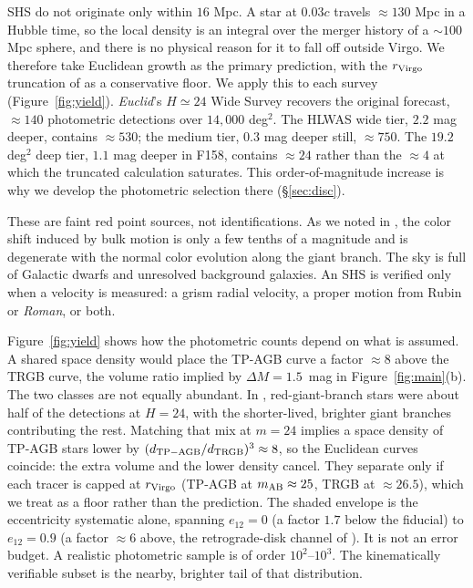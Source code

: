 \documentclass[twocolumn]{aastex701}
\begin{document}
SHS do not originate only within $16$ Mpc.
A star at $0.03c$ travels $\approx130$ Mpc in a Hubble time, so the local
density is an integral over the merger history of a $\sim100$ Mpc sphere, and
there is no physical reason for it to fall off outside Virgo. We therefore take
Euclidean growth as the primary prediction, with the $r_{\rm Virgo}$
truncation of  as a conservative floor. We apply this to each
survey (Figure~\ref{fig:yield}). \textit{Euclid}'s $H\simeq24$ Wide Survey
recovers the original  forecast, $\approx140$ photometric
detections over $14{,}000$ deg$^{2}$. The HLWAS wide tier, $2.2$ mag deeper,
contains $\approx530$; the medium tier, $0.3$ mag deeper still,
$\approx750$. The $19.2$ deg$^{2}$ deep tier, $1.1$ mag deeper in F158,
contains $\approx24$ rather than the $\approx4$ at which the truncated
calculation saturates. This order-of-magnitude increase is why we develop the
photometric selection there (\S\ref{sec:disc}).

These are faint red point sources, not identifications. As we noted in
, the color shift induced by bulk motion is only a few tenths
of a magnitude and is degenerate with the normal color evolution along the giant branch. The
sky is full of Galactic dwarfs and unresolved background galaxies. An SHS is
verified only when a velocity is measured: a grism radial velocity, a proper
motion from Rubin or \textit{Roman}, or both.

Figure~\ref{fig:yield} shows how the photometric counts depend on what is
assumed. A shared space density would place the TP-AGB curve a factor
$\approx8$ above the TRGB curve, the volume ratio implied by
$\Delta M=1.5$~mag in Figure~\ref{fig:main}(b). The two classes are not
equally abundant. In , red-giant-branch stars were about half
of the detections at $H=24$, with the shorter-lived, brighter giant branches
contributing the rest. Matching that mix at $m=24$ implies a space density
of TP-AGB stars lower by $(d_{\rm TP-AGB}/d_{\rm TRGB})^{3}\approx8$, so the
Euclidean curves coincide: the extra volume and the lower density cancel.
They separate only if each tracer is capped at $r_{\rm Virgo}$ (TP-AGB at
$m_{\rm AB}\approx25$, TRGB at $\approx26.5$), which we treat as a floor
rather than the prediction. The shaded envelope is the eccentricity
systematic alone, spanning $e_{12}=0$ (a factor $1.7$ below the fiducial) to
$e_{12}=0.9$ (a factor $\approx6$ above, the retrograde-disk channel of
\citealt{tiede24}). It is not an error budget. A realistic photometric sample
is of order $10^{2}$--$10^{3}$. The kinematically verifiable subset is the
nearby, brighter tail of that distribution.
\end{document}
